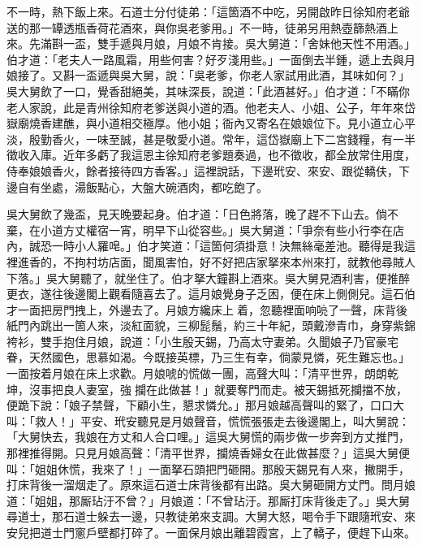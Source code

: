 不一時，熱下飯上來。石道士分付徒弟：「這箇酒不中吃，另開啟昨日徐知府老爺送的那一罈透瓶香荷花酒來，與你吳老爹用。」不一時，徒弟另用熱壺篩熱酒上來。先滿斟一盃，雙手遞與月娘，{}月娘不肯接。吳大舅道：「舍妹他天性不用酒。」伯才道：「老夫人一路風霜，用些何害？好歹淺用些。」一面倒去半鍾，遞上去與月娘接了。又斟一盃遞與吳大舅，說：「吳老爹，你老人家試用此酒，其味如何？」吳大舅飲了一口，覺香甜絕美，其味深長，說道：「此酒甚好。」伯才道：「不瞞你老人家說，此是青州徐知府老爹送與小道的酒。他老夫人、小姐、公子，年年來岱嶽廟燒香建醮，與小道相交極厚。他小姐；衙內又寄名在娘娘位下。見小道立心平淡，殷勤香火，一味至誠，甚是敬愛小道。常年，這岱嶽廟上下二宮錢糧，有一半徵收入庫。近年多虧了我這恩主徐知府老爹題奏過，也不徵收，都全放常住用度，侍奉娘娘香火，餘者接待四方香客。」{}這裡說話，下邊玳安、來安、跟從轎伕，下邊自有坐處，湯飯點心，大盤大碗酒肉，都吃飽了。

吳大舅飲了幾盃，見天晚要起身。伯才道：「日色將落，晚了趕不下山去。{}倘不棄，在小道方丈權宿一宵，明早下山從容些。」吳大舅道：「爭奈有些小行李在店內，誠恐一時小人羅唣。」伯才笑道：「這箇何須掛意！決無絲毫差池。聽得是我這裡進香的，不拘村坊店面，聞風害怕，好不好把店家拏來本州來打，就教他尋賊人下落。」{}吳大舅聽了，就坐住了。伯才拏大鐘斟上酒來。吳大舅見酒利害，便推醉更衣，{}遂往後邊閣上觀看隨喜去了。這月娘覺身子乏困，便在床上側側兒。這石伯才一面把房門拽上，外邊去了。月娘方纔床上𢱉着，忽聽裡面响喨了一聲，床背後紙門內跳出一箇人來，淡紅面貌，三柳髭鬚，約三十年紀，頭戴滲青巾，身穿紫錦袴衫，雙手抱住月娘，說道：「小生殷天錫，乃高太守妻弟。久聞娘子乃官豪宅眷，天然國色，思慕如渴。今既接英標，乃三生有幸，倘蒙見憐，死生難忘也。」{}一面按着月娘在床上求歡。月娘唬的慌做一團，高聲大叫：「清平世界，朗朗乾坤，沒事把良人妻室，強𢺞攔在此做甚！」就要奪門而走。被天錫抵死攔擋不放，便跪下說：「娘子禁聲，下顧小生，懇求憐允。」{}那月娘越高聲叫的緊了，口口大叫：「救人！」平安、玳安聽見是月娘聲音，慌慌張張走去後邊閣上，叫大舅說：「大舅快去，我娘在方丈和人合口哩。」這吳大舅慌的兩步做一步奔到方丈推門，那裡推得開。只見月娘高聲：「清平世界，攔燒香婦女在此做甚麼？」這吳大舅便叫：「姐姐休慌，我來了！」一面拏石頭把門砸開。那殷天錫見有人來，撇開手，打床背後一溜烟走了。原來這石道士床背後都有出路。吳大舅砸開方丈門。問月娘道：「姐姐，那厮玷汙不曾？」月娘道：「不曾玷汙。那厮打床背後走了。」吳大舅尋道士，那石道士躲去一邊，只教徒弟來支調。大舅大怒，喝令手下跟隨玳安、來安兒把道士門窻戶壁都打碎了。一面保月娘出離碧霞宮，上了轎子，便趕下山來。

